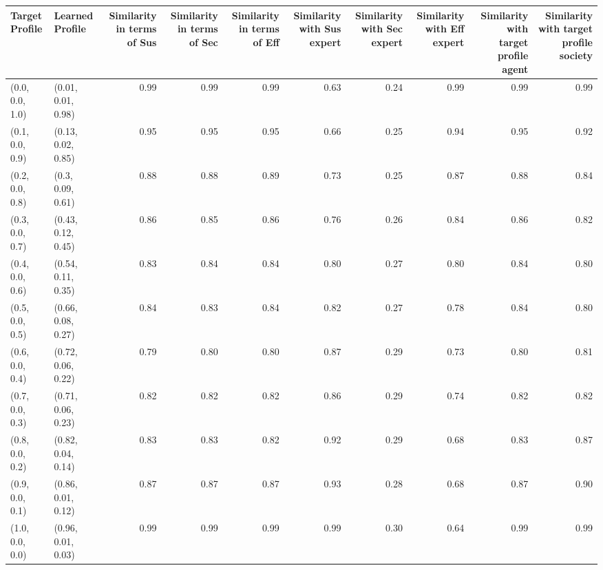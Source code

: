 \begin{tabular}{llrrrrrrrr}
\toprule
Target Profile & Learned Profile & Similarity in terms of Sus & Similarity in terms of Sec & Similarity in terms of Eff & Similarity with Sus expert & Similarity with Sec expert & Similarity with Eff expert & Similarity with target profile agent & Similarity with target profile society \\
\midrule
(0.0, 0.0, 1.0) & (0.01, 0.01, 0.98) & 0.99 & 0.99 & 0.99 & 0.63 & 0.24 & 0.99 & 0.99 & 0.99 \\
(0.1, 0.0, 0.9) & (0.13, 0.02, 0.85) & 0.95 & 0.95 & 0.95 & 0.66 & 0.25 & 0.94 & 0.95 & 0.92 \\
(0.2, 0.0, 0.8) & (0.3, 0.09, 0.61) & 0.88 & 0.88 & 0.89 & 0.73 & 0.25 & 0.87 & 0.88 & 0.84 \\
(0.3, 0.0, 0.7) & (0.43, 0.12, 0.45) & 0.86 & 0.85 & 0.86 & 0.76 & 0.26 & 0.84 & 0.86 & 0.82 \\
(0.4, 0.0, 0.6) & (0.54, 0.11, 0.35) & 0.83 & 0.84 & 0.84 & 0.80 & 0.27 & 0.80 & 0.84 & 0.80 \\
(0.5, 0.0, 0.5) & (0.66, 0.08, 0.27) & 0.84 & 0.83 & 0.84 & 0.82 & 0.27 & 0.78 & 0.84 & 0.80 \\
(0.6, 0.0, 0.4) & (0.72, 0.06, 0.22) & 0.79 & 0.80 & 0.80 & 0.87 & 0.29 & 0.73 & 0.80 & 0.81 \\
(0.7, 0.0, 0.3) & (0.71, 0.06, 0.23) & 0.82 & 0.82 & 0.82 & 0.86 & 0.29 & 0.74 & 0.82 & 0.82 \\
(0.8, 0.0, 0.2) & (0.82, 0.04, 0.14) & 0.83 & 0.83 & 0.82 & 0.92 & 0.29 & 0.68 & 0.83 & 0.87 \\
(0.9, 0.0, 0.1) & (0.86, 0.01, 0.12) & 0.87 & 0.87 & 0.87 & 0.93 & 0.28 & 0.68 & 0.87 & 0.90 \\
(1.0, 0.0, 0.0) & (0.96, 0.01, 0.03) & 0.99 & 0.99 & 0.99 & 0.99 & 0.30 & 0.64 & 0.99 & 0.99 \\
\bottomrule
\end{tabular}
